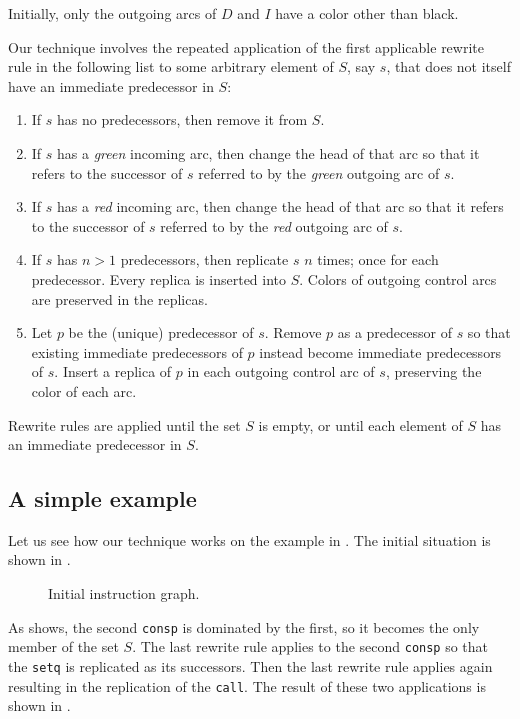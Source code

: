 Initially, only the outgoing arcs of $D$ and $I$ have a color
other than black.

Our technique involves the repeated application of the first
applicable rewrite rule in the following list to some arbitrary
element of $S$, say $s$, that does not itself have an immediate
predecessor in $S$:

\begin{enumerate}
\item If $s$ has no predecessors, then remove it from $S$.
\item If $s$ has a \emph{green} incoming arc, then change the head
  of that arc so that it refers to the successor of $s$ referred to
  by the \emph{green} outgoing arc of $s$.
\item If $s$ has a \emph{red} incoming arc, then change the head
  of that arc so that it refers to the successor of $s$ referred to
  by the \emph{red} outgoing arc of $s$.
\item If $s$ has $n>1$ predecessors, then replicate $s$ $n$ times;
  once for each predecessor.  Every replica is inserted into $S$.
  Colors of outgoing control arcs are preserved in the replicas.
\item Let $p$ be the (unique) predecessor of $s$.  Remove $p$ as a
  predecessor of $s$ so that existing immediate predecessors of $p$
  instead become immediate predecessors of $s$.  Insert a replica of
  $p$ in each outgoing control arc of $s$, preserving the color of
  each arc.
\end{enumerate}

\noindent
Rewrite rules are applied until the set $S$ is empty, or until each
element of $S$ has an immediate predecessor in $S$.

\subsection{A simple example}
\label{sec-our-technique-example}

Let us see how our technique works on the example in
.  The initial situation is shown in
.

\begin{figure}
\begin{center}
\end{center}
\caption{\label{fig-rewrite-1}
Initial instruction graph.}
\end{figure}

As  shows, the second \texttt{consp} is
dominated by the first, so it becomes the only member of the set $S$.
The last rewrite rule applies to the second \texttt{consp} so that the
\texttt{setq} is replicated as its successors.  Then the last rewrite
rule applies again resulting in the replication of the \texttt{call}.
The result of these two applications is shown in .

